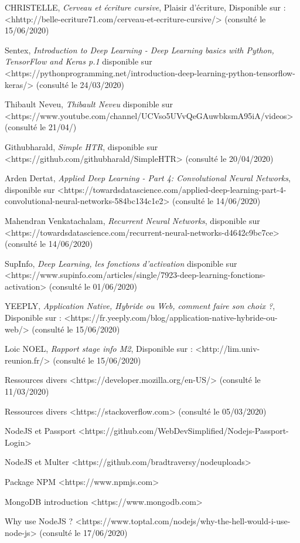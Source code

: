 \documentclass[oneside,a4paper,13pt]{article}
\begin{document}
\medbreak
[2] CHRISTELLE, \textit{Cerveau et écriture cursive}, Plaisir d'écriture, Disponible sur : <hhttp://belle-ecriture71.com/cerveau-et-ecriture-cursive/> (consulté le 15/06/2020)


\medbreak
[3] Sentex, \textit{Introduction to Deep Learning - Deep Learning basics with Python, TensorFlow and Keras p.1} disponible sur <https://pythonprogramming.net/introduction-deep-learning-python-tensorflow-keras/> (consulté le 24/03/2020)

\medbreak
[4] Thibault Neveu, \textit{Thibault Neveu} disponible sur <https://www.youtube.com/channel/UCVso5UVvQeGAuwbksmA95iA/videos> (consulté le 21/04/)

\medbreak
[5] Githubharald, \textit{Simple HTR}, disponible sur <https://github.com/githubharald/SimpleHTR> (consulté le 20/04/2020)

\medbreak
[6] Arden Dertat, \textit{Applied Deep Learning - Part 4: Convolutional Neural Networks}, disponible sur <https://towardsdatascience.com/applied-deep-learning-part-4-convolutional-neural-networks-584bc134c1e2> (consulté le 14/06/2020)

\medbreak
[7] Mahendran Venkatachalam, \textit{Recurrent Neural Networks}, disponible sur <https://towardsdatascience.com/recurrent-neural-networks-d4642c9bc7ce> (consulté le 14/06/2020)

\medbreak
[8] SupInfo, \textit{Deep Learning, les fonctions d'activation} disponible sur <https://www.supinfo.com/articles/single/7923-deep-learning-fonctions-activation> (consulté le 01/06/2020)

\medbreak
[9] YEEPLY, \textit{Application Native, Hybride ou Web, comment faire son choix ?}, Disponible sur : <https://fr.yeeply.com/blog/application-native-hybride-ou-web/> (consulté le 15/06/2020)

\medbreak
[10] Loic NOEL, \textit{Rapport stage info M2}, Disponible sur : <http://lim.univ-reunion.fr/> (consulté le 15/06/2020)

\medbreak
[11] Ressources divers <https://developer.mozilla.org/en-US/> (consulté le 11/03/2020)

\medbreak
[12] Ressources divers <https://stackoverflow.com> (consulté le 05/03/2020)

\medbreak
[13] NodeJS et Passport <https://github.com/WebDevSimplified/Nodejs-Passport-Login> 

\medbreak
[14] NodeJS et Multer <https://github.com/bradtraversy/nodeuploads> 

\medbreak
[15] Package NPM <https://www.npmjs.com> 

\medbreak
[16] MongoDB introduction <https://www.mongodb.com> 

\medbreak
[17] Why use NodeJS ? <https://www.toptal.com/nodejs/why-the-hell-would-i-use-node-js> 
(consulté le 17/06/2020)
\end{document}
